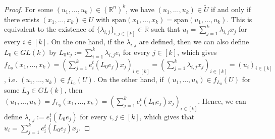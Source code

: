\begin{proof}
For some $(u_1,\ldots,u_k)\in(\mathbb{R}^n)^k$, we have $(u_1,\ldots,u_k)\in\tilde{U}$ if and only if there exists $(x_1,\ldots,x_k)\in U$ with $\mathrm{span}(x_1,\ldots,x_k)=\mathrm{span}(u_1,\ldots,u_k)$. This is equivalent to the existence of $\{\lambda_{i,j}\}_{i,j\in[k]}\in\mathbb{R}$ such that $u_i=\sum_{j=1}^k\lambda_{i,j}x_j$ for every $i\in[k]$. On the one hand, if the $\lambda_{i,j}$ are defined, then we can also define $L_0\in GL(k)$ by $L_0e_j:=\sum_{i=1}^k\lambda_{i,j}e_i$ for every $j\in[k]$, which gives $f_{L_0}(x_1,\ldots,x_k)=\left(\sum_{j=1}^ke_i^t(L_0e_j)x_j\right)_{i\in[k]}=\left(\sum_{j=1}^k\lambda_{i,j}x_j\right)_{i\in[k]}=(u_i)_{i\in[k]}$, i.e. $(u_1,\ldots,u_k)\in f_{L_0}(U)$. On the other hand, if $(u_1,\ldots,u_k)\in f_{L_0}(U)$ for some $L_0\in GL(k)$, then $(u_1,\ldots,u_k)=f_{L_0}(x_1,\ldots,x_k)=\left(\sum_{j=1}^ke_i^t(L_0e_j)x_j\right)_{i\in[k]}$. Hence, we can define $\lambda_{i,j}:=e_i^t(L_0e_j)$ for every $i,j\in[k]$, which gives that $u_i=\sum_{j=1}^ke_i^t(L_0e_j)x_j$.
\end{proof}







